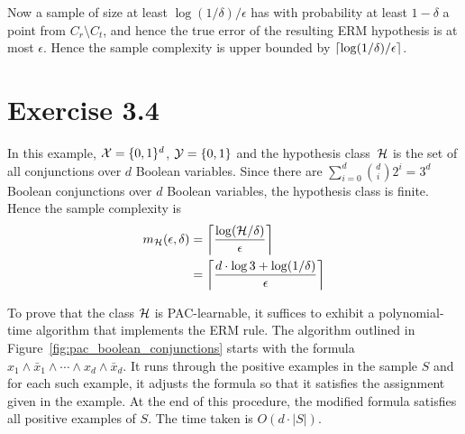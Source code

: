 Now a sample of size at least $\log(1 / \delta) / \epsilon$ has with probability at least $1 - \delta$ a point from $C_r \setminus C_t$, and hence the true error of the resulting ERM hypothesis is at most $\epsilon$. Hence the sample complexity is upper bounded by $\left \lceil \log(1 / \delta) / \epsilon \right \rceil$.

\section*{Exercise 3.4}

In this example, $\mathcal{X} = \{0, 1\}^d$, $\mathcal{Y} = \{0, 1\}$ and the hypothesis class~$\mathcal{H}$ is the set of all conjunctions over $d$ Boolean variables. Since there are $\sum_{i = 0}^{d} {d \choose i} 2^i = 3^{d}$ Boolean conjunctions over $d$ Boolean variables, the hypothesis class is finite. Hence the sample complexity is 
\begin{align*}
	m_{\mathcal{H}}(\epsilon, \delta) & = \left \lceil \frac{\log (\mathcal{H} / \delta)}{\epsilon} \right \rceil \\
	& = \left \lceil \frac{d \cdot \log 3 + \log (1 / \delta)}{\epsilon} \right \rceil
\end{align*}

To prove that the class $\mathcal{H}$ is PAC-learnable, it suffices to exhibit a polynomial-time algorithm that implements the ERM rule. The algorithm outlined in Figure~\ref{fig:pac_boolean_conjunctions} starts with the formula $x_1 \land \bar{x}_1 \land \cdots \land x_d \land \bar{x}_d$. It runs through the positive examples in the sample $S$ and for each such example, it adjusts the formula so that it satisfies the assignment given in the example. At the end of this procedure, the modified formula satisfies all positive examples of $S$. The time taken is $O(d \cdot |S|)$. 

